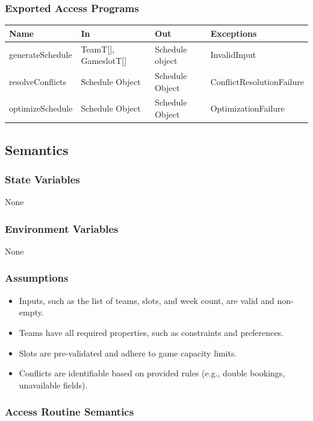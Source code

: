 \documentclass[12pt, titlepage]{article}
\begin{document}
\subsubsection{Exported Access Programs}

\begin{center}
  \begin{tabular}{|p{3cm}|p{3.5cm}|p{3.5cm}|p{5cm}|}
  \hline
  Name & In & Out & Exceptions \\
  \hline
  generateSchedule & TeamT[], GameslotT[] & Schedule object & InvalidInput \\
  resolveConflicts & Schedule Object & Schedule Object & ConflictResolutionFailure \\
  optimizeSchedule & Schedule Object & Schedule Object & OptimizationFailure \\
  \hline
  \end{tabular}
\end{center}

\subsection{Semantics}

\subsubsection{State Variables}
None

\subsubsection{Environment Variables}
None

\subsubsection{Assumptions}
\begin{itemize}
  \item Inputs, such as the list of teams, slots, and week count, are valid and non-empty.
  \item Teams have all required properties, such as constraints and preferences.
  \item Slots are pre-validated and adhere to game capacity limits.
  \item Conflicts are identifiable based on provided rules (e.g., double bookings, unavailable fields).
\end{itemize}

\subsubsection{Access Routine Semantics}
\end{document}
